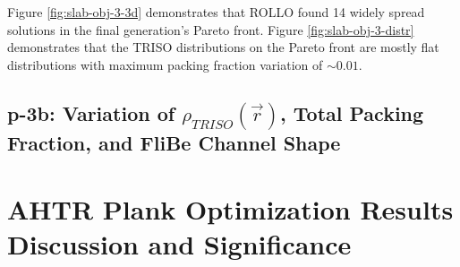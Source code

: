 Figure \ref{fig:slab-obj-3-3d} demonstrates that \gls{ROLLO} found 14 widely spread 
solutions in the final generation's Pareto front. 
Figure \ref{fig:slab-obj-3-distr} demonstrates that the TRISO distributions on the
Pareto front are mostly flat distributions with maximum packing fraction variation 
of $\sim0.01$. 

\subsection{p-3b: Variation of $\rho_{TRISO}(\vec{r})$, Total Packing Fraction, and FliBe Channel Shape}

\section{AHTR Plank Optimization Results Discussion and Significance}
